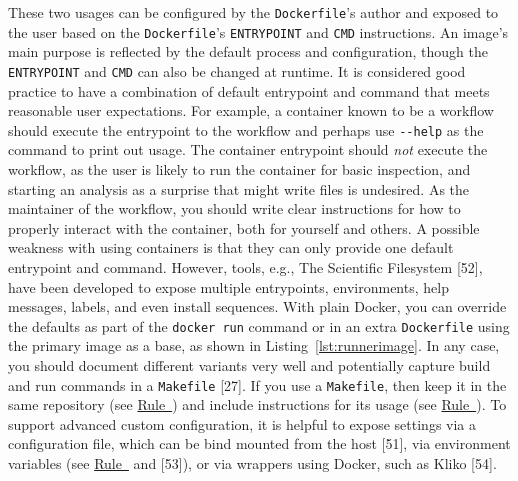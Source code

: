 \documentclass[10pt,letterpaper]{article}
\begin{document}
These two usages can be configured by the \texttt{Dockerfile}'s author
and exposed to the user based on the \texttt{Dockerfile}'s
\texttt{ENTRYPOINT} and \texttt{CMD} instructions. An image's main
purpose is reflected by the default process and configuration, though
the \texttt{ENTRYPOINT} and \texttt{CMD} can also be changed at runtime.
It is considered good practice to have a combination of default
entrypoint and command that meets reasonable user expectations. For
example, a container known to be a workflow should execute the
entrypoint to the workflow and perhaps use \texttt{-\/-help} as the
command to print out usage. The container entrypoint should \emph{not}
execute the workflow, as the user is likely to run the container for
basic inspection, and starting an analysis as a surprise that might
write files is undesired. As the maintainer of the workflow, you should
write clear instructions for how to properly interact with the
container, both for yourself and others. A possible weakness with using
containers is that they can only provide one default entrypoint and
command. However, tools, e.g., The Scientific Filesystem {[}52{]}, have
been developed to expose multiple entrypoints, environments, help
messages, labels, and even install sequences. With plain Docker, you can
override the defaults as part of the \texttt{docker\ run} command or in
an extra \texttt{Dockerfile} using the primary image as a base, as shown
in Listing~\ref{lst:runnerimage}. In any case, you should document
different variants very well and potentially capture build and run
commands in a \texttt{Makefile} {[}27{]}. If you use a
\texttt{Makefile}, then keep it in the same repository (see
\hyperref[{rule:mount}]{Rule~}) and include
instructions for its usage (see
\hyperref[{rule:document}]{Rule~}). To support
advanced custom configuration, it is helpful to expose settings via a
configuration file, which can be bind mounted from the host {[}51{]},
via environment variables (see
\hyperref[{rule:pinning}]{Rule~} and {[}53{]}),
or via wrappers using Docker, such as Kliko {[}54{]}.

\scriptsize
\end{document}
